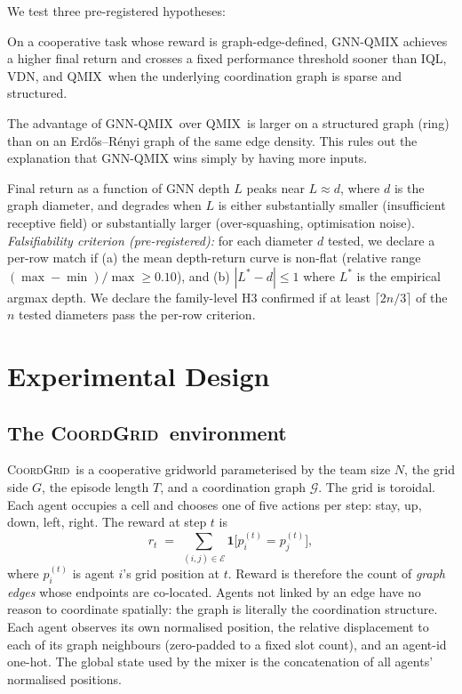 \documentclass[manuscript, screen, review]{jair}
\newcommand{\algoname}[1]{\textsc{#1}}
\newcommand{\iql}{\algoname{IQL}}
\newcommand{\vdn}{\algoname{VDN}}
\newcommand{\qmix}{\algoname{QMIX}}
\newcommand{\gnnqmix}{\algoname{GNN-QMIX}}
\newcommand{\coordgrid}{\textsc{CoordGrid}}
\newcommand{\Egraph}{\mathcal{E}}
\newcommand{\Gtask}{\mathcal{G}}
\begin{document}
We test three pre-registered hypotheses:

\begin{description}[leftmargin=4em,style=nextline]
  \item[\textbf{H1 (structure beats no-structure):}]
    On a cooperative task whose reward is graph-edge-defined, \gnnqmix
    achieves a higher final return and crosses a fixed performance
    threshold sooner than \iql, \vdn, and \qmix\ when the underlying
    coordination graph is sparse and structured.
  \item[\textbf{H2 (structure $>$ matched-density random):}]
    The advantage of \gnnqmix\ over \qmix\ is larger on a structured
    graph (ring) than on an Erd\H{o}s--R\'enyi graph of the same edge
    density. This rules out the explanation that GNN-QMIX wins simply by
    having more inputs.
  \item[\textbf{H3 (depth--diameter inverted-U):}]
    Final return as a function of GNN depth $L$ peaks near $L \approx d$,
    where $d$ is the graph diameter, and degrades when $L$ is either
    substantially smaller (insufficient receptive field) or substantially
    larger (over-squashing, optimisation noise). \emph{Falsifiability
    criterion (pre-registered):} for each diameter $d$ tested, we declare
    a per-row match if (a) the mean depth-return curve is non-flat
    (relative range $(\max - \min)/\max \ge 0.10$), and (b) $|L^* - d|
    \le 1$ where $L^*$ is the empirical argmax depth. We declare the
    family-level H3 confirmed if at least $\lceil 2n/3 \rceil$ of the $n$
    tested diameters pass the per-row criterion.
\end{description}

\section{Experimental Design}
\label{sec:design}

\subsection{The \coordgrid\ environment}
\label{sec:env}

\coordgrid\ is a cooperative gridworld parameterised by the team size $N$,
the grid side $G$, the episode length $T$, and a coordination graph
$\Gtask$. The grid is toroidal. Each agent occupies a cell and chooses one
of five actions per step: stay, up, down, left, right. The reward at step
$t$ is
\[
  r_t \;=\; \sum_{(i,j) \in \Egraph} \mathbf{1}\bigl[p_i^{(t)} = p_j^{(t)}\bigr],
\]
where $p_i^{(t)}$ is agent $i$'s grid position at $t$. Reward is therefore
the count of \emph{graph edges} whose endpoints are co-located. Agents not
linked by an edge have no reason to coordinate spatially: the graph is
literally the coordination structure. Each agent observes its own
normalised position, the relative displacement to each of its graph
neighbours (zero-padded to a fixed slot count), and an agent-id one-hot.
The global state used by the mixer is the concatenation of all agents'
normalised positions.
\end{document}
